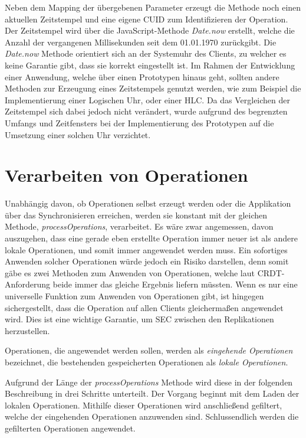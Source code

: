 \documentclass[a4paper, 12pt]{scrreprt}
\begin{document}
Neben dem Mapping der übergebenen Parameter erzeugt die Methode noch einen aktuellen Zeitstempel und eine eigene CUID zum Identifizieren der Operation. Der Zeitstempel wird über die JavaScript-Methode \textit{Date.now} erstellt, welche die Anzahl der vergangenen Millisekunden seit dem 01.01.1970 zurückgibt. Die \textit{Date.now} Methode orientiert sich an der Systemuhr des Clients, zu welcher es keine Garantie gibt, dass sie korrekt eingestellt ist. Im Rahmen der Entwicklung einer Anwendung, welche über einen Prototypen hinaus geht, sollten andere Methoden zur Erzeugung eines Zeitstempels genutzt werden, wie zum Beispiel die Implementierung einer Logischen Uhr, oder einer \ac{HLC}. Da das Vergleichen der Zeitstempel sich dabei jedoch nicht verändert, wurde aufgrund des begrenzten Umfangs und Zeitfensters bei der Implementierung des Prototypen auf die Umsetzung einer solchen Uhr verzichtet.

\section{Verarbeiten von Operationen}
\label{sec:processOperations}

Unabhängig davon, ob Operationen selbst erzeugt werden oder die Applikation über das Synchronisieren erreichen, werden sie konstant mit der gleichen Methode, \textit{processOperations}, verarbeitet. Es wäre zwar angemessen, davon auszugehen, dass eine gerade eben erstellte Operation immer neuer ist als andere lokale Operationen, und somit immer angewendet werden muss. Ein sofortiges Anwenden solcher Operationen würde jedoch ein Risiko darstellen, denn somit gäbe es zwei Methoden zum Anwenden von Operationen, welche laut CRDT-Anforderung beide immer das gleiche Ergebnis liefern müssten. Wenn es nur eine universelle Funktion zum Anwenden von Operationen gibt, ist hingegen sichergestellt, dass die Operation auf allen Clients gleichermaßen angewendet wird. Dies ist eine wichtige Garantie, um \ac{SEC} zwischen den Replikationen herzustellen.

Operationen, die angewendet werden sollen, werden als \textit{eingehende Operationen} bezeichnet, die bestehenden gespeicherten Operationen als \textit{lokale Operationen}.

Aufgrund der Länge der \textit{processOperations} Methode wird diese in der folgenden Beschreibung in drei Schritte unterteilt. Der Vorgang beginnt mit dem Laden der lokalen Operationen. Mithilfe dieser Operationen wird anschließend gefiltert, welche der eingehenden Operationen anzuwenden sind. Schlussendlich werden die gefilterten Operationen angewendet.
\end{document}
